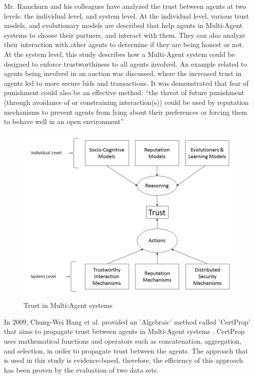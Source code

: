 \documentclass[runningheads,a4paper]{llncs}
\begin{document}
Mr. Ramchurn and his colleagues have analyzed the trust between agents at two levels: the individual level, and system level. At the individual level, various trust models, and evolutionary models are described that help agents in Multi-Agent systems to choose their partners, and interact with them. They can also analyze their interaction with other agents to determine if they are being honest or not. At the system level, this study describes how a Multi-Agent system could be designed to enforce trustworthiness to all agents involved. An example related to agents being involved in an auction was discussed, where the increased trust in agents led to more secure bids and transactions. It was demonstrated that fear of punishment could also be an effective method: ``the threat of future punishment (through
avoidance of or constraining interaction(s)) could be used by reputation mechanisms to prevent
agents from lying about their preferences or forcing them to behave well in an open environment''
\newpage
\begin{figure}
	\centering
		\includegraphics[width=\textwidth]{Figures/MultiAgents.jpg}
	\caption{Trust in Multi-Agent systems \cite{ramchurn2004trust}}
\end{figure}

In 2009, Chung-Wei Hang et al. provided an 'Algebraic' method called 'CertProp' that aims to propagate trust between agents in Multi-Agent systems \cite{hang2009operators}. CertProp uses mathematical functions and operators such as concatenation, aggregation, and selection, in order to propagate trust between the agents. The approach that is used in this study is evidence-based, therefore, the efficiency of this approach has been proven by the evaluation of two data sets.
\end{document}
